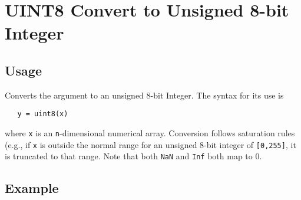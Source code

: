 \section{UINT8 Convert to Unsigned 8-bit Integer}

\subsection{Usage}

Converts the argument to an unsigned 8-bit Integer.  The syntax
for its use is
\begin{verbatim}
   y = uint8(x)
\end{verbatim}
where \verb|x| is an \verb|n|-dimensional numerical array.  Conversion
follows saturation rules (e.g., if \verb|x| is outside the normal
range for an unsigned 8-bit integer of \verb|[0,255]|, it is truncated 
to that range. Note that
both \verb|NaN| and \verb|Inf| both map to 0.
\subsection{Example}

